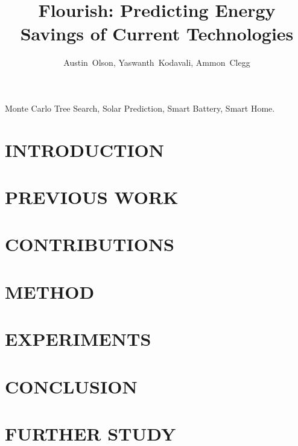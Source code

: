 \documentclass[conference]{IEEEtran}
\begin{document}
\title{Flourish: Predicting Energy Savings of Current Technologies\\}
\author{Austin~Olson, Yaswanth~Kodavali, Ammon~Clegg %
}%

\maketitle

\begin{abstract}

\end{abstract}

\renewcommand\IEEEkeywordsname{Key Words}
\begin{IEEEkeywords}
Monte Carlo Tree Search, Solar Prediction, Smart Battery, Smart Home.
\end{IEEEkeywords}

\section{INTRODUCTION}
\IEEEPARstart


\section{PREVIOUS WORK}


\section{CONTRIBUTIONS}


\section{METHOD}


\section{EXPERIMENTS}


\section{CONCLUSION}


\section{FURTHER STUDY}

\end{document}
